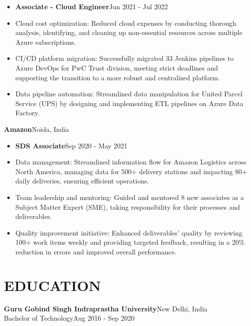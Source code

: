 \documentclass[11pt,a4paper]{article}
\newenvironment{dashlist}{
  \begin{itemize}[label={--}]
}{
  \end{itemize}
}
\begin{document}
\begin{itemize}
\item \textbf{Associate - Cloud Engineer}\hfill Jun 2021 - Jul 2022
\end{itemize}
\begin{dashlist}
    \item Cloud cost optimization: Reduced cloud expenses by conducting thorough analysis, identifying, and cleaning up non-essential resources across multiple Azure subscriptions.
    \item CI/CD platform migration: Successfully migrated 33 Jenkins pipelines to Azure DevOps for PwC Trust division, meeting strict deadlines and supporting the transition to a more robust and centralized platform.
    \item Data pipeline automation: Streamlined data manipulation for United Parcel Service (UPS) by designing and implementing ETL pipelines on Azure Data Factory.
\end{dashlist}

\noindent\textbf{Amazon}\hfill Noida, India
\begin{itemize}
\item \textbf{SDS Associate}\hfill Sep 2020 - May 2021
\end{itemize}
\begin{dashlist}
    \item Data management: Streamlined information flow for Amazon Logistics across North America, managing data for 500+ delivery stations and impacting 80+ daily deliveries, ensuring efficient operations.
    \item Team leadership and mentoring: Guided and mentored 8 new associates as a Subject Matter Expert (SME), taking responsibility for their processes and deliverables.
    \item Quality improvement initiative: Enhanced deliverables' quality by reviewing 100+ work items weekly and providing targeted feedback, resulting in a 20\% reduction in errors and improved overall performance.
\end{dashlist}

\section*{EDUCATION}
\noindent\textbf{Guru Gobind Singh Indraprastha University}\hfill New Delhi, India\\
Bachelor of Technology\hfill Aug 2016 - Sep 2020
\end{document}
